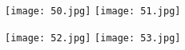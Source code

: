 \begin{figure}[!htbp]
%
\centering
\texttt{[image: 50.jpg]}
\subcaption{}
\endminipage\hfill
{}%
\centering
\texttt{[image: 51.jpg]}
\endminipage\hfill
\caption{}
\end{figure}




\begin{figure}[!htbp]
%
\centering
\texttt{[image: 52.jpg]}
\subcaption{}
\endminipage\hfill
{}%
\centering
\texttt{[image: 53.jpg]}
\endminipage\hfill
\caption{}
\end{figure}

